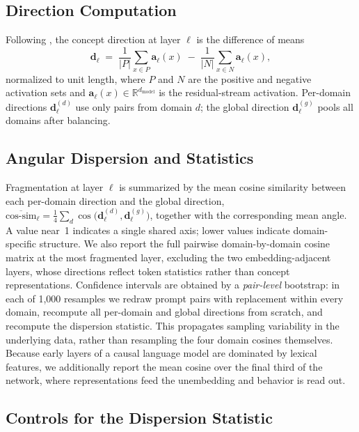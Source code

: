 \documentclass[11pt]{article}
\newcommand{\cosim}{\text{cos-sim}}
\newcommand{\dmodel}{d_{\text{model}}}
\newcommand{\vdir}{\mathbf{d}}
\newcommand{\vact}{\mathbf{a}}
\newcommand{\R}{\mathbb{R}}
\begin{document}
\subsection{Direction Computation}
\label{sec:directions}

Following \citet{zou2023representation}, the concept direction at layer
$\ell$ is the difference of means
\begin{equation}
  \vdir_\ell \;=\;
  \frac{1}{|P|}\sum_{x \in P} \vact_\ell(x)
  \;-\;
  \frac{1}{|N|}\sum_{x \in N} \vact_\ell(x),
\end{equation}
normalized to unit length, where $P$ and $N$ are the positive and negative
activation sets and $\vact_\ell(x) \in \R^{\dmodel}$ is the residual-stream
activation. Per-domain directions $\vdir_\ell^{(d)}$ use only pairs from
domain $d$; the global direction $\vdir_\ell^{(g)}$ pools all domains after
balancing.

\subsection{Angular Dispersion and Statistics}
\label{sec:angular}

Fragmentation at layer $\ell$ is summarized by the mean cosine similarity
between each per-domain direction and the global direction,
$\overline{\cosim}_\ell = \tfrac{1}{4}\sum_d
\cos\!\big(\vdir_\ell^{(d)}, \vdir_\ell^{(g)}\big)$,
together with the corresponding mean angle. A value near~1 indicates a
single shared axis; lower values indicate domain-specific structure. We also
report the full pairwise domain-by-domain cosine matrix at the most
fragmented layer, excluding the two embedding-adjacent layers, whose
directions reflect token statistics rather than concept representations.
Confidence intervals are obtained by a \emph{pair-level} bootstrap: in each
of 1{,}000 resamples we redraw prompt pairs with replacement within every
domain, recompute all per-domain and global directions from scratch, and
recompute the dispersion statistic. This propagates sampling variability in
the underlying data, rather than resampling the four domain cosines
themselves. Because early layers of a causal language model are dominated by
lexical features, we additionally report the mean cosine over the final
third of the network, where representations feed the unembedding and
behavior is read out.

\subsection{Controls for the Dispersion Statistic}
\label{sec:controls}
\end{document}
